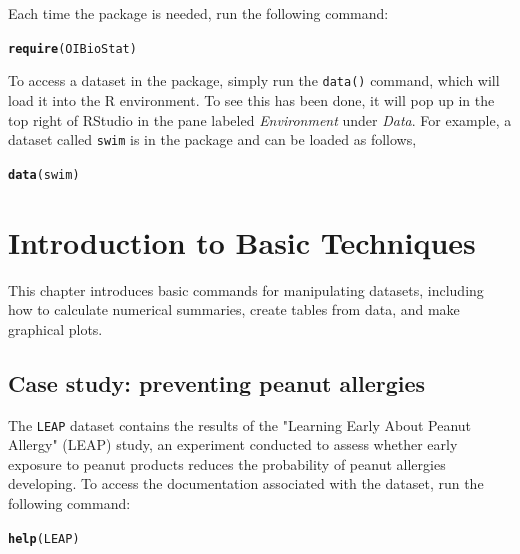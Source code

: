 \documentclass{report}\usepackage[]{graphicx}\usepackage[]{color}
\makeatletter
\newcommand{\hlstd}[1]{\textcolor[rgb]{0.345,0.345,0.345}{#1}}%
\newcommand{\hlkwd}[1]{\textcolor[rgb]{0.737,0.353,0.396}{\textbf{#1}}}%
\newenvironment{kframe}{%
 \def\at@end@of@kframe{}%
 \ifinner\ifhmode%
  \def\at@end@of@kframe{\end{minipage}}%
  \begin{minipage}{\columnwidth}%
 \fi\fi%
 \def\FrameCommand##1{\hskip\@totalleftmargin \hskip-\fboxsep
 \colorbox{shadecolor}{##1}\hskip-\fboxsep
     \hskip-\linewidth \hskip-\@totalleftmargin \hskip\columnwidth}%
 \MakeFramed {\advance\hsize-\width
   \@totalleftmargin\z@ \linewidth\hsize
   \@setminipage}}%
 {\par\unskip\endMakeFramed%
 \at@end@of@kframe}
\newenvironment{knitrout}{}{} %
\makeatother
\begin{document}
Each time the package is needed, run the following command: 
\begin{knitrout}
\color{fgcolor}\begin{kframe}
\begin{alltt}
\hlkwd{require}\hlstd{(OIBioStat)}
\end{alltt}
\end{kframe}
\end{knitrout}

To access a dataset in the package, simply run the \texttt{data()} command, which will load it into the \textsf{R} environment.  To see this has been done, it will pop up in the top right of \textsf{RStudio} in the pane labeled \textit{Environment} under \textit{Data}.  For example, a dataset called \texttt{swim} is in the package and can be loaded as follows, 
\begin{knitrout}
\color{fgcolor}\begin{kframe}
\begin{alltt}
\hlkwd{data}\hlstd{(swim)}
\end{alltt}
\end{kframe}
\end{knitrout}


\newpage
\chapter{Introduction to Basic Techniques}
\minitoc

\vspace{0.5cm} 

This chapter introduces basic commands for manipulating datasets, including how to calculate numerical summaries, create tables from data, and make graphical plots. 

\section{Case study: preventing peanut allergies}

The \texttt{LEAP} dataset contains the results of the "Learning Early About Peanut Allergy" (LEAP) study, an experiment conducted to assess whether early exposure to peanut products reduces the probability of peanut allergies developing. To access the documentation associated with the dataset, run the following command: 

\begin{knitrout}
\color{fgcolor}\begin{kframe}
\begin{alltt}
\hlkwd{help}\hlstd{(LEAP)}
\end{alltt}
\end{kframe}
\end{knitrout}
\end{document}
